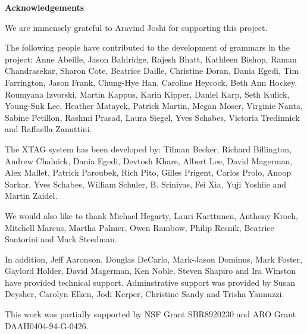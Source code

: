 \pagestyle{plain}
\null\vfil
\begin{center}
{\bf Acknowledgements}
\end{center}
\setcounter{page}{0}

We are immensely grateful to Aravind Joshi for supporting this
project. 

The following people have contributed to the development of grammars in the
project: Anne Abeille, Jason Baldridge, Rajesh Bhatt, Kathleen Bishop,
Raman Chandrasekar, Sharon Cote, Beatrice Daille, Christine Doran, Dania
Egedi, Tim Farrington, Jason Frank, Chung-Hye Han, Caroline Heycock, Beth
Ann Hockey, Roumyana Izvorski, Martin Kappus, Karin Kipper, Daniel Karp,
Seth Kulick, Young-Suk Lee, Heather Matayek, Patrick Martin, Megan Moser,
Virginie Nanta, Sabine Petillon, Rashmi Prasad, Laura Siegel, Yves Schabes,
Victoria Tredinnick and Raffaella Zanuttini.

The XTAG system has been developed by: Tilman Becker, Richard
Billington, Andrew Chalnick, Dania Egedi, Devtosh Khare, Albert Lee,
David Magerman, Alex Mallet, Patrick Paroubek, Rich Pito, Gilles
Prigent, Carlos Prolo, Anoop Sarkar, Yves Schabes, William Schuler,
B. Srinivas, Fei Xia, Yuji Yoshiie and Martin Zaidel.

We would also like to thank Michael Hegarty, Lauri Karttunen, Anthony
Kroch, Mitchell Marcus, Martha Palmer, Owen Rambow, Philip Resnik,
Beatrice Santorini and Mark Steedman.

In addition, Jeff Aaronson, Douglas DeCarlo, Mark-Jason Dominus, Mark
Foster, Gaylord Holder, David Magerman, Ken Noble, Steven Shapiro and
Ira Winston have provided technical support.  Adminstrative support
was provided by Susan Deysher, Carolyn Elken, Jodi Kerper, Christine
Sandy and Trisha Yannuzzi.

This work was partially supported by  NSF Grant SBR8920230 and ARO Grant
DAAH0404-94-G-0426. 

\newpage

